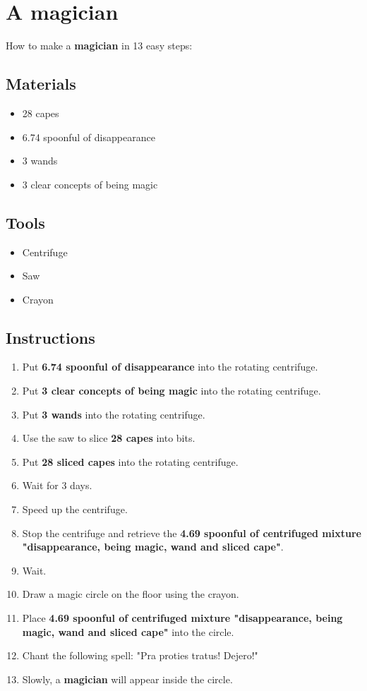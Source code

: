 \documentclass{article}
\begin{document}
\section{A magician}How to make a \textbf{magician} in 13 easy steps:

\subsection{Materials}\begin{itemize}
\item 
28 capes
\item 
6.74 spoonful of disappearance
\item 
3 wands
\item 
3 clear concepts of being magic
\end{itemize}
\subsection{Tools}\begin{itemize}
\item 
Centrifuge
\item 
Saw
\item 
Crayon
\end{itemize}
\subsection{Instructions}\begin{enumerate}
\item 
Put \textbf{6.74 spoonful of disappearance} into the rotating centrifuge.
\item 
Put \textbf{3 clear concepts of being magic} into the rotating centrifuge.
\item 
Put \textbf{3 wands} into the rotating centrifuge.
\item 
Use the saw to slice \textbf{28 capes} into bits.
\item 
Put \textbf{28 sliced capes} into the rotating centrifuge.
\item 
Wait for 3 days.
\item 
Speed up the centrifuge.
\item 
Stop the centrifuge and retrieve the \textbf{4.69 spoonful of centrifuged mixture "disappearance, being magic, wand and sliced cape"}.
\item 
Wait.
\item 
Draw a magic circle on the floor using the crayon.
\item 
Place \textbf{4.69 spoonful of centrifuged mixture "disappearance, being magic, wand and sliced cape"} into the circle.
\item 
Chant the following spell: "Pra proties tratus! Dejero!"
\item 
Slowly, a \textbf{magician} will appear inside the circle.
\end{enumerate}
\newpage
\end{document}
